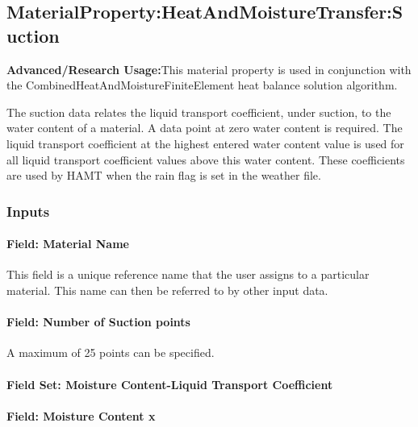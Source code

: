 \subsection{MaterialProperty:HeatAndMoistureTransfer:Suction}\label{materialpropertyheatandmoisturetransfersuction}

\textbf{Advanced/Research Usage:}This material property is used in conjunction with the CombinedHeatAndMoistureFiniteElement heat balance solution algorithm.

The suction data relates the liquid transport coefficient, under suction, to the water content of a material. A data point at zero water content is required. The liquid transport coefficient at the highest entered water content value is used for all liquid transport coefficient values above this water content. These coefficients are used by HAMT when the rain flag is set in the weather file.

\subsubsection{Inputs}\label{inputs-9-022}

\paragraph{Field: Material Name}\label{field-material-name-2}

This field is a unique reference name that the user assigns to a particular material. This name can then be referred to by other input data.

\paragraph{Field: Number of Suction points}\label{field-number-of-suction-points}

A maximum of 25 points can be specified.

\paragraph{Field Set: Moisture Content-Liquid Transport Coefficient}\label{field-set-moisture-content-liquid-transport-coefficient}

\paragraph{Field: Moisture Content x}\label{field-moisture-content-x-1}

